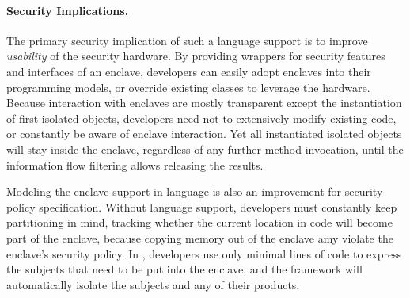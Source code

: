 \paragraph{Security Implications.}
The primary security implication of such a language support is to
improve {\em usability} of the security hardware.
By providing wrappers for security features and interfaces of an enclave,
developers can easily adopt enclaves into their programming models,
or override existing classes to leverage the hardware.
Because interaction with enclaves are mostly transparent
except the instantiation of first isolated objects,
developers need not to extensively modify existing code,
or constantly be aware of enclave interaction.
Yet all instantiated isolated objects will stay inside the enclave,
regardless of any further method invocation,
until the information flow filtering allows releasing the results.

Modeling the enclave support in language is also an improvement
for security policy specification.
Without language support, developers must constantly
keep partitioning in mind,
tracking whether the current location in code
will become part of the enclave,
because copying memory out of the enclave amy
violate the enclave's security policy.
In \sysname{}, developers use only minimal lines of code to
express the subjects that need to be put into the enclave,
and the framework will automatically isolate the subjects and any
of their products.  



